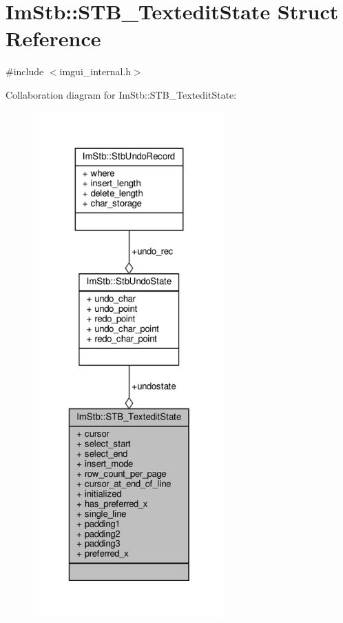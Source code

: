 \hypertarget{structImStb_1_1STB__TexteditState}{}\section{Im\+Stb\+:\+:S\+T\+B\+\_\+\+Textedit\+State Struct Reference}
\label{structImStb_1_1STB__TexteditState}


{\ttfamily \#include $<$imgui\+\_\+internal.\+h$>$}



Collaboration diagram for Im\+Stb\+:\+:S\+T\+B\+\_\+\+Textedit\+State\+:
\nopagebreak
\begin{figure}[H]
\begin{center}
\leavevmode
\includegraphics[height=550pt]{structImStb_1_1STB__TexteditState__coll__graph}
\end{center}
\end{figure}
